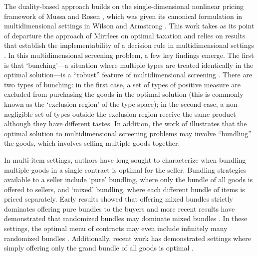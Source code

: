The duality-based approach \autocite{rochet1998ironing} builds on the single-dimensional nonlinear pricing framework of Mussa and Rosen \autocite*{mussa1978}, which was given its canonical formulation in multidimensional settings in Wilson \autocite*{wilson1993nonlinear} and Armstrong \autocite*{armstrong1996multiproduct}. This work takes as its point of departure the approach of Mirrlees \autocite*{mirrlees1971} on optimal taxation and relies on results that establish the implementability of a decision rule in multidimensional settings \autocite{rochet1987}. In this multidimensional screening problem, a few key findings emerge. The first is that `bunching'---a situation where multiple types are treated identically in the optimal solution---is a ``robust'' feature of multidimensional screening \autocite{rochetstole2003,rochet1998ironing}. There are two types of bunching: in the first case, a set of types of positive measure are excluded from purchasing the goods in the optimal solution (this is commonly known as the `exclusion region' of the type space); in the second case, a non-negligible set of types outside the exclusion region receive the same product although they have different tastes. In addition, the work of \autocite{rochet1998ironing} illustrates that the optimal solution to multidimensional screening problems may involve ``bundling'' the goods, which involves selling multiple goods together.

In multi-item settings, authors have long sought to characterize when bundling multiple goods in a single contract is optimal for the seller. Bundling strategies available to a seller include `pure' bundling, where only the bundle of all goods is offered to sellers, and `mixed' bundling, where each different bundle of items is priced separately. Early results showed that offering mixed bundles strictly dominates offering pure bundles to the buyers \autocite{adams1976,mcafee1989} and more recent results have demonstrated that randomized bundles may dominate mixed bundles \autocite{thanassoulis2004,daskalakis2017strong}. In these settings, the optimal menu of contracts may even include infinitely many randomized bundles \autocite{manelli2007multidimensional,hart2019}. Additionally, recent work has demonstrated settings where simply offering only the grand bundle of all goods is optimal \autocite{haghpanah2021}.

